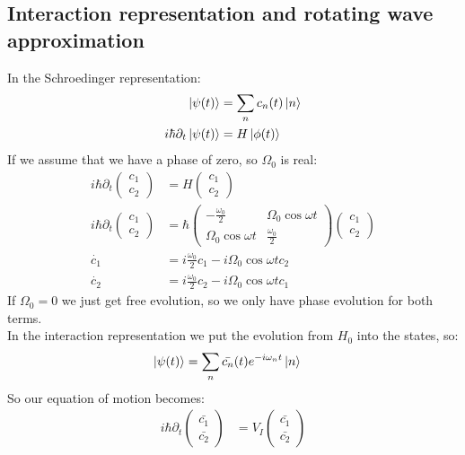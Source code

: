 \subsection{Interaction representation and rotating wave approximation}
In the Schroedinger representation:
\begin{align*}
	\ket{\psi(t)} &= \sum_n c_n(t) \ket{n} \\
	i\hbar \partial_t \ket{\psi(t)} &= H\ket{\phi(t)}
\end{align*}
If we assume that we have a phase of zero, so $\Omega_0$ is real:
\begin{align*}
	i\hbar \partial_t \begin{pmatrix}c_1 \\ c_2\end{pmatrix} &= H \begin{pmatrix}c_1 \\ c_2\end{pmatrix} \\
	i\hbar \partial_t \begin{pmatrix}c_1 \\ c_2\end{pmatrix} &= \hbar \begin{pmatrix} -\frac{\omega_0}{2} & \Omega_0 \cos\omega t \\ \Omega_0\cos\omega t & \frac{\omega_0}{2}\end{pmatrix} \begin{pmatrix}c_1 \\ c_2\end{pmatrix} \\
	\dot{c_1} &= i \frac{\omega_0}{2} c_1 - i\Omega_0\cos\omega t c_2 \\
	\dot{c_2} &= i \frac{\omega_0}{2} c_2 - i\Omega_0\cos\omega t c_1
\end{align*}
If $\Omega_0 = 0$ we just get free evolution, so we only have phase evolution for both terms. \\
In the interaction representation we put the evolution from $H_0$ into the states, so:
\begin{align*}
	\ket{\psi(t)} &= \sum_n \bar{c_n}(t) e^{-i \omega_n t} \ket{n}
\end{align*}
So our equation of motion becomes:
\begin{align*}
	i \hbar \partial_t \begin{pmatrix}\bar{c_1} \\ \bar{c_2} \end{pmatrix} &= V_I \begin{pmatrix}\bar{c_1} \\ \bar{c_2}\end{pmatrix}
\end{align*}
